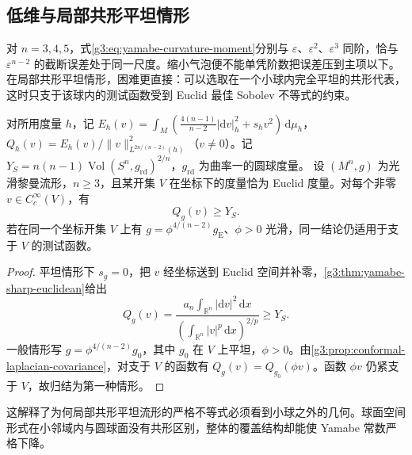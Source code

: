 \subsection{低维与局部共形平坦情形}
\label{g3:subsec:2405:02}
对 \(n=3,4,5\)，式\eqref{g3:eq:yamabe-curvature-moment}分别与 \(\varepsilon\)、\(\varepsilon^2\)、\(\varepsilon^3\) 同阶，恰与 \(\varepsilon^{n-2}\) 的截断误差处于同一尺度。缩小气泡便不能单凭阶数把误差压到主项以下。在局部共形平坦情形，困难更直接：可以选取在一个小球内完全平坦的共形代表，这时只支于该球内的测试函数受到 Euclid 最佳 Sobolev 不等式的约束。

\begin{proposition}\label{g3:prop:yamabe-flat-local-tests}
	对所用度量 \(h\)，记 \(E_h(v)=\int_M(\tfrac{4(n-1)}{n-2}|\mathrm dv|_h^2+s_hv^2)\,\mathrm d\mu_h\)，\(Q_h(v)=E_h(v)/\|v\|_{L^{2n/(n-2)}(h)}^2\)（\(v\ne0\)）。记 \(Y_S=n(n-1)\operatorname{Vol}(S^n,g_{\mathrm{rd}})^{2/n}\)，\(g_{\mathrm{rd}}\) 为曲率一的圆球度量。
	设 \((M^n,g)\) 为光滑黎曼流形，\(n\ge3\)，且某开集 \(V\) 在坐标下的度量恰为 Euclid 度量。对每个非零 \(v\in C_c^\infty(V)\)，有
	\[
		Q_g(v)\ge Y_S.
	\]
	若在同一个坐标开集 \(V\) 上有 \(g=\phi^{4/(n-2)}g_{\mathrm E}\)、\(\phi>0\) 光滑，同一结论仍适用于支于 \(V\) 的测试函数。
\end{proposition}
\begin{proof}
	平坦情形下 \(s_g=0\)，把 \(v\) 经坐标送到 Euclid 空间并补零，\cref{g3:thm:yamabe-sharp-euclidean}给出
	\[
		Q_g(v)=\frac{a_n\int_{\mathbb R^n}|\mathrm dv|^2\,\mathrm dx}
		{(\int_{\mathbb R^n}|v|^p\,\mathrm dx)^{2/p}}
		\ge Y_S.
	\]
	一般情形写 \(g=\phi^{4/(n-2)}g_0\)，其中 \(g_0\) 在 \(V\) 上平坦，\(\phi>0\)。由\cref{g3:prop:conformal-laplacian-covariance}，对支于 \(V\) 的函数有 \(Q_g(v)=Q_{g_0}(\phi v)\)。函数 \(\phi v\) 仍紧支于 \(V\)，故归结为第一种情形。
\end{proof}
这解释了为何局部共形平坦流形的严格不等式必须看到小球之外的几何。球面空间形式在小邻域内与圆球面没有共形区别，整体的覆盖结构却能使 Yamabe 常数严格下降。


